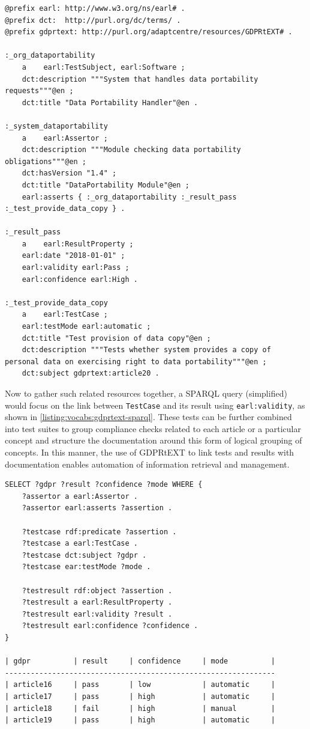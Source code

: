 \begin{lstlisting}[label={listing:vocab:gdprtext-earl},caption={Use of GDPRtEXT to link tests with GDPR Articles in EARL report}]
@prefix earl: http://www.w3.org/ns/earl# .
@prefix dct:  http://purl.org/dc/terms/ .
@prefix gdprtext: http://purl.org/adaptcentre/resources/GDPRtEXT# .

:_org_dataportability
    a    earl:TestSubject, earl:Software ;
    dct:description """System that handles data portability requests"""@en ;
    dct:title "Data Portability Handler"@en .

:_system_dataportability
    a    earl:Assertor ;
    dct:description """Module checking data portability obligations"""@en ;
    dct:hasVersion "1.4" ;
    dct:title "DataPortability Module"@en ;
    earl:asserts { :_org_dataportability :_result_pass :_test_provide_data_copy } .

:_result_pass
    a    earl:ResultProperty ;
    earl:date "2018-01-01" ;
    earl:validity earl:Pass ;
    earl:confidence earl:High .

:_test_provide_data_copy
    a    earl:TestCase ;
    earl:testMode earl:automatic ;
    dct:title "Test provision of data copy"@en ;
    dct:description """Tests whether system provides a copy of personal data on exercising right to data portability"""@en ;
    dct:subject gdprtext:article20 .
\end{lstlisting}

Now to gather such related resources together, a SPARQL query (simplified) would focus on the link between \texttt{TestCase} and its result using \texttt{earl:validity}, as shown in \autoref{listing:vocabs:gdprtext-sparql}.
These tests can be further combined into test suites to group compliance checks related to each article or a particular concept and structure the documentation around this form of logical grouping of concepts.
In this manner, the use of GDPRtEXT to link tests and results with documentation enables automation of information retrieval and management.

\begin{lstlisting}[label={listing:vocabs:gdprtext-sparql},caption={SPARQL query and results showing retrieved GDPR test results by article}]
SELECT ?gdpr ?result ?confidence ?mode WHERE {
    ?assertor a earl:Assertor .
    ?assertor earl:asserts ?assertion .

    ?testcase rdf:predicate ?assertion .
    ?testcase a earl:TestCase .
    ?testcase dct:subject ?gdpr .
    ?testcase ear:testMode ?mode .

    ?testresult rdf:object ?assertion .
    ?testresult a earl:ResultProperty .
    ?testresult earl:validity ?result .
    ?testresult earl:confidence ?confidence .
}

| gdpr          | result     | confidence     | mode          |
---------------------------------------------------------------
| article16     | pass       | low            | automatic     |
| article17     | pass       | high           | automatic     |
| article18     | fail       | high           | manual        |
| article19     | pass       | high           | automatic     |
\end{lstlisting}

